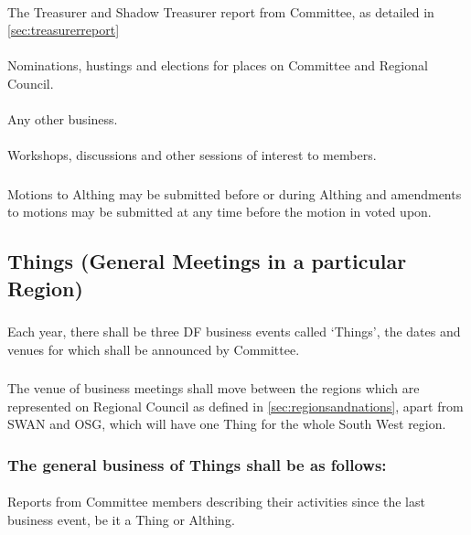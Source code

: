 \documentclass[a4paper, 12pt]{report}
\begin{document}
\paragraph{}
The Treasurer and Shadow Treasurer report from Committee, as detailed in \ref{sec:treasurerreport}
\paragraph{}
Nominations, hustings and elections for places on Committee and Regional Council.
\paragraph{}
Any other business.
\paragraph{}
Workshops, discussions and other sessions of interest to members.
\subsubsection{}
Motions to Althing may be submitted before or during Althing and amendments to motions may be submitted at any time before the motion in voted upon.

\subsection{Things (General Meetings in a particular Region)}
\subsubsection{}
Each year, there shall be three DF business events called `Things', the dates and venues for which shall be announced by Committee.
\subsubsection{}
The venue of business meetings shall move between the regions which are represented on Regional Council as defined in \ref{sec:regionsandnations}, apart from SWAN and OSG, which will have one Thing for the whole South West region.
\subsubsection{The general business of Things shall be as follows:}
\paragraph{}
Reports from Committee members describing their activities since the last business event, be it a Thing or Althing.
\end{document}
